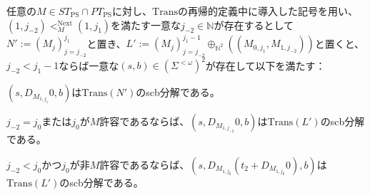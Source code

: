 \documentclass[dvipdfmx,uplatex]{jsarticle}
\theoremstyle{customnonumberbreakfortheorem}
\theoremstyle{customnonumberbreakforproof}
\begin{document}
\begin{lemma}\label{条件(III)～(V)の下での右端の置き換えとTransの関係}
	任意の\(M \in ST_{\textrm{PS}} \cap PT_{\textrm{PS}}\)に対し、\(\textrm{Trans}\)の再帰的定義中に導入した記号を用い、\((1,j_{-2}) <_M^{\textrm{Next}} (1,j_1)\)を満たす一意な\(j_{-2} \in \mathbb{N}\)が存在するとして\(N' := (M_j)_{j=j_{-2}}^{j_1}\)と置き、\(L' := (M_j)_{j=j_{-2}}^{j_1-1} \oplus_{\mathbb{N}^2}((M_{0,j_1},M_{1,j_{-2}}))\)と置くと、\(j_{-2} < j_1-1\)ならば一意な\((s,b) \in (\Sigma^{< \omega})^2\)が存在して以下を満たす：
	\begin{penumerate}
		\item \((s,D_{M_{1,j_1}} 0,b)\)は\(\textrm{Trans}(N')\)のscb分解である。
		\item \(j_{-2} = j_0\)または\(j_0\)が\(M\)許容であるならば、\((s,D_{M_{1,j_{-2}}} 0,b)\)は\(\textrm{Trans}(L')\)のscb分解である。
		\item \(j_{-2} < j_0\)かつ\(j_0\)が非\(M\)許容であるならば、\((s,D_{M_{1,j_0}}(t_2 + D_{M_{1,j_0}} 0),b)\)は\(\textrm{Trans}(L')\)のscb分解である。
	\end{penumerate}
\end{lemma}
\end{document}
